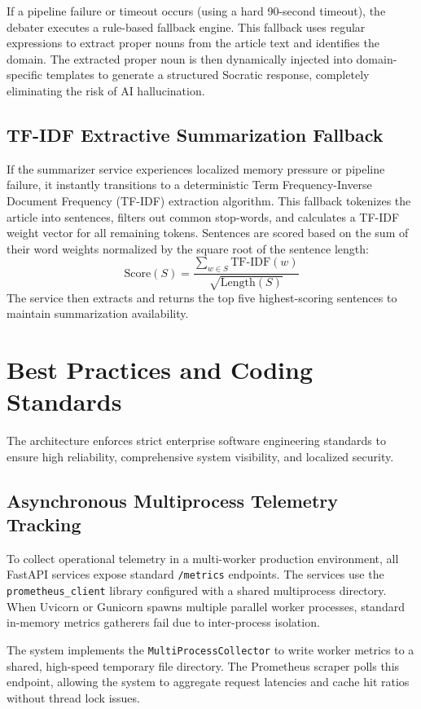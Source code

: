If a pipeline failure or timeout occurs (using a hard 90-second timeout), the debater executes a rule-based fallback engine. This fallback uses regular expressions to extract proper nouns from the article text and identifies the domain. The extracted proper noun is then dynamically injected into domain-specific templates to generate a structured Socratic response, completely eliminating the risk of AI hallucination.

\subsection{TF-IDF Extractive Summarization Fallback}
If the summarizer service experiences localized memory pressure or pipeline failure, it instantly transitions to a deterministic Term Frequency-Inverse Document Frequency (TF-IDF) extraction algorithm. This fallback tokenizes the article into sentences, filters out common stop-words, and calculates a TF-IDF weight vector for all remaining tokens. Sentences are scored based on the sum of their word weights normalized by the square root of the sentence length:
\begin{equation}
    \text{Score}(S) = \frac{\sum_{w \in S} \text{TF-IDF}(w)}{\sqrt{\text{Length}(S)}}
\end{equation}
The service then extracts and returns the top five highest-scoring sentences to maintain summarization availability.

\section{Best Practices and Coding Standards}
The architecture enforces strict enterprise software engineering standards to ensure high reliability, comprehensive system visibility, and localized security.

\subsection{Asynchronous Multiprocess Telemetry Tracking}
To collect operational telemetry in a multi-worker production environment, all FastAPI services expose standard \texttt{/metrics} endpoints. The services use the \texttt{prometheus\_client} library configured with a shared multiprocess directory. When Uvicorn or Gunicorn spawns multiple parallel worker processes, standard in-memory metrics gatherers fail due to inter-process isolation. 

The system implements the \texttt{MultiProcessCollector} to write worker metrics to a shared, high-speed temporary file directory. The Prometheus scraper polls this endpoint, allowing the system to aggregate request latencies and cache hit ratios without thread lock issues.


